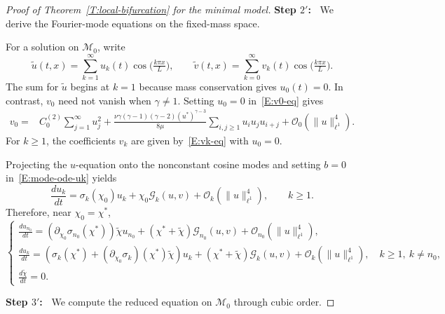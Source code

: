 \documentclass[11pt]{article} %
\theoremstyle{remark}
\theoremstyle{remark}
\numberwithin{equation}{section}
\numberwithin{figure}{section}
\numberwithin{table}{section}
\begin{document}
\begin{proof}[Proof of Theorem~\ref{T:local-bifurcation} for the minimal model]
  \smallskip

  \noindent\textbf{Step $2'$:~} We derive the Fourier-mode equations on the
  fixed-mass space.

  \smallskip

  For a solution on $\mathcal{M}_0$, write
  \[
    \widetilde{u}(t,x)
    =\sum_{k=1}^\infty u_k(t)\cos\Big(\tfrac{k\pi x}{L}\Big),\qquad
    \widetilde{v}(t,x)
    =\sum_{k=0}^\infty v_k(t)\cos\Big(\tfrac{k\pi x}{L}\Big).
  \]
  The sum for $\widetilde{u}$ begins at $k = 1$ because mass conservation gives
  $u_0(t) = 0$. In contrast, $v_0$ need not vanish when $\gamma \ne 1$. Setting
  $u_0 = 0$ in~\eqref{E:v0-eq} gives
  \begin{align*}
    v_0
    ={}&C_0^{(2)}\sum_{j=1}^\infty u_j^2
    +\frac{\nu\gamma(\gamma-1)(\gamma-2)(u^*)^{\gamma-3}}{8\mu}
    \sum_{i,j\ge1}u_i u_j u_{i+j}
    +\mathcal{O}_0\left(\|u\|_{\ell^1}^4\right).
  \end{align*}
  For $k \ge 1$, the coefficients $v_k$ are given by~\eqref{E:vk-eq} with $u_0 =
  0$.

  Projecting the $u$-equation onto the nonconstant cosine modes and setting $b =
  0$ in~\eqref{E:mode-ode-uk} yields
  \[
    \frac{du_k}{dt}
    =\sigma_k(\chi_0)u_k
    +\chi_0\mathcal{G}_k(u,v)
    +\mathcal{O}_k\left(\|u\|_{\ell^1}^4\right),\qquad k\ge1.
  \]
  Therefore, near $\chi_0 = \chi^*$,
  \begin{equation}\label{E:ode-chi*-minimal}
    \begin{cases}
      \displaystyle
      \frac{du_{n_0}}{dt}
      =\left(\partial_{\chi_0}\sigma_{n_0}(\chi^*)\right)
      \widetilde{\chi} u_{n_0}
      +(\chi^*+\widetilde{\chi})\mathcal{G}_{n_0}(u,v)
      +\mathcal{O}_{n_0}\left(\|u\|_{\ell^1}^4\right),
      \\[3mm]
      \displaystyle
      \frac{du_k}{dt}
      =\left(\sigma_k(\chi^*)
      +(\partial_{\chi_0}\sigma_k)(\chi^*)\widetilde{\chi}\right)u_k
      +(\chi^*+\widetilde{\chi})\mathcal{G}_k(u,v)
      +\mathcal{O}_k\left(\|u\|_{\ell^1}^4\right),
      \quad k\ge1,\ k\ne n_0,
      \\[3mm]
      \displaystyle
      \frac{d\widetilde{\chi}}{dt}=0.
    \end{cases}
  \end{equation}

  \smallskip

  \noindent\textbf{Step $3'$:~} We compute the reduced equation on
  $\mathcal{M}_0$ through cubic order.

  \smallskip


\end{proof}
\end{document}
